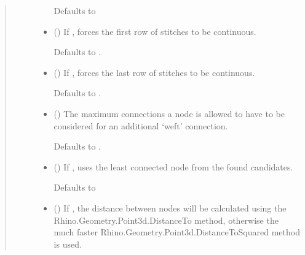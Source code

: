 \documentclass[letterpaper,10pt,english]{sphinxmanual}
\begin{document}
\begin{fulllineitems}
\begin{fulllineitems}
\begin{quote}
\begin{description}
\begin{itemize}
Defaults to 


\item {} 
 (\sphinxstyleliteralemphasis{\sphinxupquote{, }}) \textendash{} 
If , forces the first row of stitches to be continuous.

Defaults to .


\item {} 
 (\sphinxstyleliteralemphasis{\sphinxupquote{, }}) \textendash{} 
If , forces the last row of stitches to be continuous.

Defaults to .


\item {} 
 (\sphinxstyleliteralemphasis{\sphinxupquote{, }}) \textendash{} 
The maximum connections a node is allowed to have to be considered
for an additional ‘weft’ connection.

Defaults to .


\item {} 
 (\sphinxstyleliteralemphasis{\sphinxupquote{, }}) \textendash{} 
If , uses the least connected node from the found
candidates.

Defaults to 


\item {} 
 (\sphinxstyleliteralemphasis{\sphinxupquote{, }}) \textendash{} 
If , the distance between nodes will be calculated using the
Rhino.Geometry.Point3d.DistanceTo method, otherwise the much faster
Rhino.Geometry.Point3d.DistanceToSquared method is used.


\end{itemize}
\end{description}
\end{quote}
\end{fulllineitems}
\end{fulllineitems}
\end{document}
